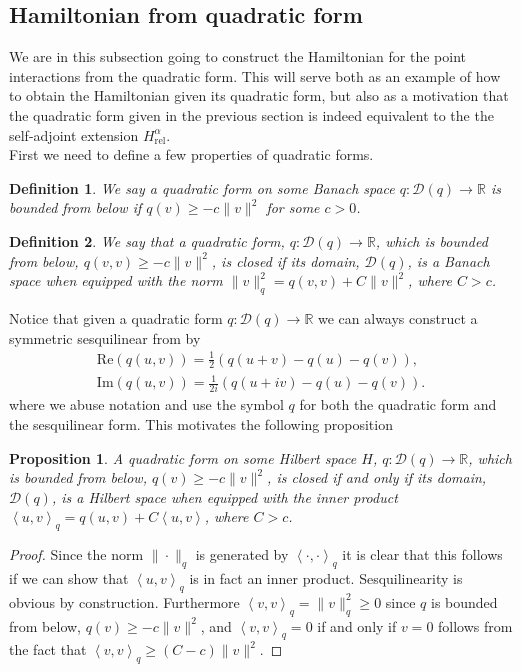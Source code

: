 \documentclass[a4paper,11pt]{article}
\newcommand{\Real}{\text{Re}}
\newcommand{\Imag}{\text{Im}}
\newcommand{\dom}[1]{\mathscr D\left(#1\right)}
\renewcommand{\braket}[1]{\left\langle#1\right\rangle}
\newcommand{\R}{\mathbb{R}}
\newtheorem{definition}{Definition}
\newtheorem{proposition}{Proposition}
\numberwithin{equation}{section}
\begin{document}
\subsection{Hamiltonian from quadratic form}
We are in this subsection going to construct the Hamiltonian for the point interactions from the quadratic form. This will serve both as an example of how to obtain the Hamiltonian given its quadratic form, but also as a motivation that the quadratic form given in the previous section is indeed equivalent to the the self-adjoint extension $ H_{\text{rel}}^\alpha $.\\
First we need to define a few properties of quadratic forms.\begin{definition}
	We say a quadratic form on some Banach space $ q: \dom{q}\to\R $ is bounded from below if $ q(v)\geq-c\|v\|^2 $ for some $ c>0 $. 
\end{definition}
\begin{definition}
	We say that a quadratic form, $ q:\dom{q}\to\R $, which is bounded from below, $ q(v,v)\geq-c\|v\|^2 $, is closed if its domain, $ \dom{q} $, is a Banach space when equipped with the norm $ \|v\|^2_q=q(v,v)+C\|v\|^2 $, where $ C>c $.
\end{definition}
Notice that given a quadratic form $ q:\dom{q}\to\R $ we can always construct a symmetric sesquilinear from by \begin{equation}
\begin{aligned}
\Real (q(u,v))=\frac{1}{2}(q(u+v)-q(u)-q(v)),\\ \Imag(q(u,v))=\frac{1}{2i}(q(u+iv)-q(u)-q(v)).
\end{aligned}
\end{equation}
where we abuse notation and use the symbol $ q $ for both the quadratic form and the sesquilinear form.
This motivates the following proposition \begin{proposition}
	A quadratic form on some Hilbert space $ H $, $ q:\dom{q}\to\R $, which is bounded from below, $ q(v)\geq-c\|v\|^2 $, is closed if and only if its domain, $ \dom{q} $, is a Hilbert space when equipped with the inner product $ \braket{u,v}_q=q(u,v)+C\braket{u,v} $, where $ C>c $.
\end{proposition}
\begin{proof}
	Since the norm $ \|\cdot\|_q$ is generated by $ \braket{\cdot,\cdot}_q $ it is clear that this follows if we can show that $ \braket{u,v}_q $ is in fact an inner product. Sesquilinearity is obvious by construction. Furthermore $ \braket{v,v}_q=\|v\|_q^2\geq0 $ since $ q $ is bounded from below, $ q(v)\geq-c\|v\|^2 $, and $ \braket{v,v}_q=0 $ if and only if $ v=0 $ follows from the fact that $ \braket{v,v}_q\geq(C-c)\|v\|^2 $.
\end{proof}
\end{document}
